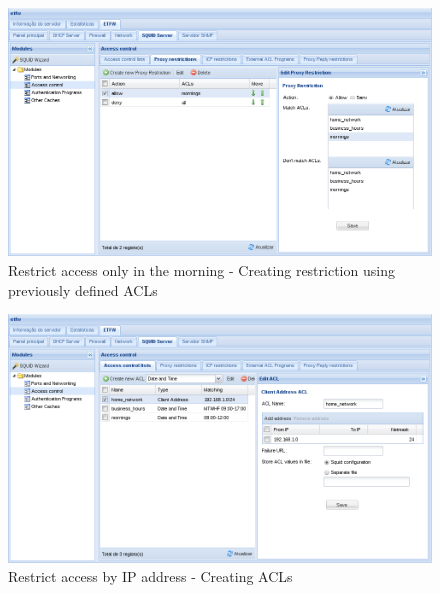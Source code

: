 \begin{figure}[H]
    \begin{center}
    \includegraphics[scale=0.38]{screenshots/etfw/etfw_squid_example_time_02_02.png}
    \caption{Restrict access only in the morning - Creating restriction using previously defined ACLs}
    \label{fig:etfw_squid_example_time_02_02}
    \end{center}
\end{figure}

\begin{figure}[H]
    \begin{center}
    \includegraphics[scale=0.38]{screenshots/etfw/etfw_squid_example_acessoip_01.png}
    \caption{Restrict access by IP address - Creating ACLs}
    \label{fig:etfw_squid_example_acessoip_01}
    \end{center}
\end{figure}


